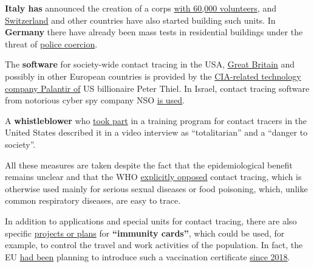\textbf{Italy has} announced the creation of a corps
\href{https://www.thelocal.it/20200525/italy-seeks-60000-volunteers-to-enforce-coronavirus-rules}{with
60,000 volunteers}, and
\href{https://www.nzz.ch/zuerich/coronavirus-in-zuerich-contact-tracing-ist-gut-angelaufen-ld.1556846}{Switzerland}
and other countries have also started building such units. In
\textbf{Germany} there have already been mass tests in residential
buildings under the threat of
\href{https://www.youtube.com/watch?v=6ZQFpnskP8g}{police coercion}.

The \textbf{software} for society-wide contact tracing in the USA,
\href{https://www.telegraph.co.uk/technology/2020/05/16/inside-story-cia-backed-palantir-embedded-nhs-socialite-running/}{Great
Britain} and possibly in other European countries is provided by the
\href{https://techcrunch.com/2020/04/01/palantir-coronavirus-cdc-nhs-gotham-foundry/}{CIA-related
technology company Palantir of} US billionaire Peter Thiel. In Israel,
contact tracing software from notorious cyber spy company NSO
\href{https://www.techdirt.com/articles/20200402/14261944226/controversial-spyware-vendor-nso-group-is-helping-israeli-government-spy-own-citizens.shtml}{is
used}.

A \textbf{whistleblower} who
\href{https://www.youtube.com/watch?v=qFUyZWw7qoc}{took part} in a
training program for contact tracers in the United States described it
in a video interview as ``totalitarian'' and a ``danger to society''.

All these measures are taken despite the fact that the epidemiological
benefit remains unclear and that the WHO
\href{https://apps.who.int/iris/bitstream/handle/10665/329438/9789241516839-eng.pdf}{explicitly
opposed} contact tracing, which is otherwise used mainly for serious
sexual diseases or food poisoning, which, unlike common respiratory
diseases, are easy to trace.

In addition to applications and special units for contact tracing, there
are also specific
\href{https://www.msn.com/en-us/news/world/the-uk-government-is-in-talks-with-facial-recognition-firms-to-develop-covid-19-immunity-passports/ar-BB12J6It}{projects
or plans} for \textbf{``immunity cards''}, which could be used, for
example, to control the travel and work activities of the population. In
fact, the EU
\href{https://off-guardian.org/2020/05/22/report-eu-planning-vaccination-passport-since-2018/}{had
been} planning to introduce such a vaccination certificate
\href{https://off-guardian.org/2020/05/22/report-eu-planning-vaccination-passport-since-2018/}{since
2018}.

